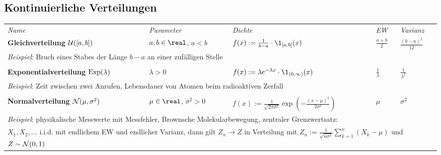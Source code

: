 \begin{landscape}
\subsection{%
    Kontinuierliche Verteilungen%
}

\begin{tabular}{p{85mm}p{40mm}p{65mm}p{20mm}p{27mm}}
    \toprule
    \emph{Name} & \emph{Parameter} & \emph{Dichte} & \emph{EW} & \emph{Varianz}\\

    \addlinespace[5mm]
    \midrule
    \textbf{Gleichverteilung $\mathcal{U}([a, b])$} &
    $a, b \in \real$, $a < b$ &
    $f(x) := \frac{1}{b-a} \cdot \1_{[a,b]}(x)$ &
    $\frac{a+b}{2}$ &
    $\frac{(b-a)^2}{12}$\\
    \multicolumn{5}{l}{\emph{Beispiel}:
    Bruch eines Stabes der Länge $b - a$ an einer zufälligen Stelle}\\
    \multicolumn{5}{l}{}\\

    \addlinespace[5mm]
    \midrule
    \textbf{Exponentialverteilung $\operatorname{Exp}(\lambda)$} &
    $\lambda > 0$ &
    $f(x) := \lambda e^{-\lambda x} \cdot \1_{(0,\infty)}(x)$ &
    $\frac{1}{\lambda}$ &
    $\frac{1}{\lambda^2}$\\
    \multicolumn{5}{l}{\emph{Beispiel}:
    Zeit zwischen zwei Anrufen, Lebensdauer von Atomen beim radioaktiven Zerfall}\\
    \multicolumn{5}{l}{}\\

    \addlinespace[5mm]
    \midrule
    \textbf{Normalverteilung $\mathcal{N}(\mu, \sigma^2)$} &
    $\mu \in \real$, $\sigma^2 > 0$ &
    $f(x) := \frac{1}{\sqrt{2\pi\sigma^2}} \exp(-\frac{(x-\mu)^2}{2\sigma^2})$ &
    $\mu$ &
    $\sigma^2$\\
    \multicolumn{5}{l}{\emph{Beispiel}:
    physikalische Messwerte mit Messfehler, Brownsche Molekularbewegung,
    zentraler Grenzwertsatz:}\\
    \multicolumn{5}{l}{$X_1, X_2, \dotsc$ i.i.d. mit endlichem EW und
    endlicher Varianz, dann gilt
    $Z_n \to Z$ in Verteilung mit
    $Z_n := \frac{1}{\sqrt{n\sigma^2}} \sum_{k=1}^n (X_k - \mu)$ und
    $Z \sim \mathcal{N}(0, 1)$}\\



\end{tabular}
\end{landscape}
